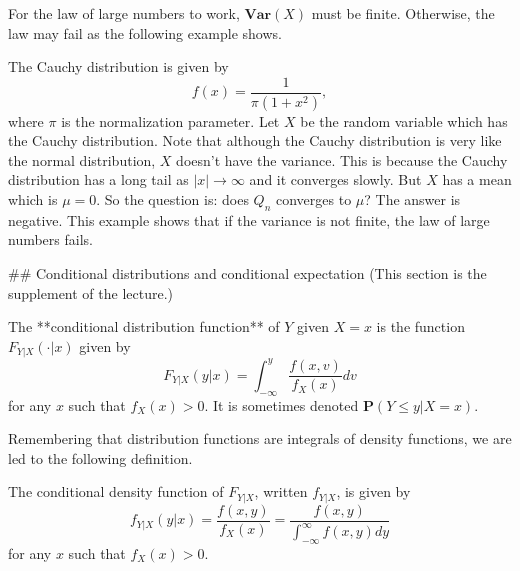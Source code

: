 \begin{caution}
For the law of large numbers to work, $\mathbf{Var}(X)$ must be finite. Otherwise, the law may fail as the following example shows.
\end{caution}

\begin{example}
The Cauchy distribution is given by
\begin{equation*}
    f(x) = \frac{1}{\pi (1+x^2)},
\end{equation*}
where $\pi$ is the normalization parameter. Let $X$ be the random variable which has the Cauchy distribution. Note that although the Cauchy distribution is very like the normal distribution, $X$ doesn't have the variance. This is because the Cauchy distribution has a long tail as $\left\vert x \right\vert\to\infty$ and it converges slowly. But $X$ has a mean which is $\mu = 0$. So the question is: does $Q_n$ converges to $\mu$? The answer is negative. This example shows that if the variance is not finite, the law of large numbers fails.
\end{example}



## Conditional distributions and conditional expectation
(This section is the supplement of the lecture.)

\begin{definition}
The **conditional distribution function** of $Y$ given $X = x$ is the function $F_{Y\vert X} (\cdot \vert x)$ given by
\begin{equation*}
    F_{Y | X}(y | x)=\int_{-\infty}^{y} \frac{f(x, v)}{f_{X}(x)} d v
\end{equation*}
for any $x$ such that $f_X(x) > 0$. It is sometimes denoted $\mathbf{P} (Y \leq y \vert X = x)$. 
\end{definition}

Remembering that distribution functions are integrals of density functions, we are led to the following definition. 
\begin{definition}
The conditional density function of $F_{Y\vert X}$, written $f_{Y\vert X}$, is given by
\begin{equation*}
    f_{Y | X}(y | x)=\frac{f(x, y)}{f_{X}(x)} = \frac{f(x, y)}{\int_{-\infty}^{\infty} f(x, y) d y}
\end{equation*}
for any $x$ such that $f_X(x) > 0$. 
\end{definition}

